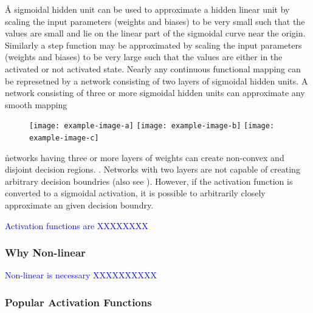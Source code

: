 \r{A sigmoidal hidden unit can be used to approximate a hidden linear unit by scaling the input parameters (weights and biases) to be very small such that the values are small and lie on the linear part of the sigmoidal curve near the origin. Similarly a step function may be approximated by scaling the input parameters (weights and biases) to be very large such that the values are either in the activated or not activated state. Nearly any continuous functional mapping can be represetned by a network consisting of two layers of sigmoidal hidden units.  A network consisting of three or more sigmoidal hidden units can approximate any smooth mapping }


\begin{figure}[htp]
	\centering
	\texttt{[image: example-image-a]}\hfil
	\texttt{[image: example-image-b]}\hfil
	\texttt{[image: example-image-c]}\hfil
	\caption{}
	\label{fig:foundations_ann_layers_decision_region}
\end{figure}

\r{networks having three or more layers of weights can create non-convex and disjoint decision regions. . Networks with two layers are not capable of creating arbitrary decision boundries  (also see ). However, if the activation function is converted to a sigmoidal activation, it is possible to arbitrarily closely approximate an given decision boundry.}


\textcolor{blue}{Activation functions are XXXXXXXX}

\subsubsection{Why Non-linear}

\textcolor{blue}{Non-linear is necessary XXXXXXXXXX}


\subsubsection{Popular Activation Functions}

